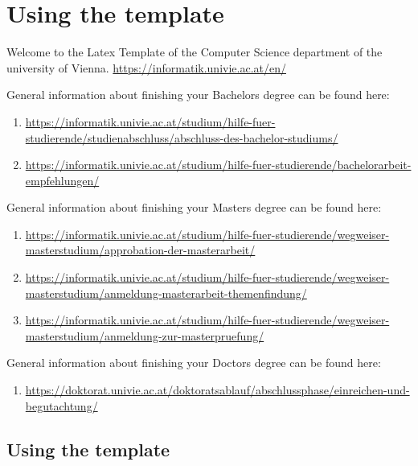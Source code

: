 \chapter{Using the template}
	
Welcome to the Latex Template of the Computer Science department of the university of Vienna. 
\url{https://informatik.univie.ac.at/en/}

General information about finishing your Bachelors degree can be found here:
\begin{enumerate}
    \item \url{https://informatik.univie.ac.at/studium/hilfe-fuer-studierende/studienabschluss/abschluss-des-bachelor-studiums/}
    \item \url{https://informatik.univie.ac.at/studium/hilfe-fuer-studierende/bachelorarbeit-empfehlungen/}
\end{enumerate}

General information about finishing your Masters degree can be found here:
\begin{enumerate}
    \item \url{https://informatik.univie.ac.at/studium/hilfe-fuer-studierende/wegweiser-masterstudium/approbation-der-masterarbeit/}
    \item \url{https://informatik.univie.ac.at/studium/hilfe-fuer-studierende/wegweiser-masterstudium/anmeldung-masterarbeit-themenfindung/}
    \item \url{https://informatik.univie.ac.at/studium/hilfe-fuer-studierende/wegweiser-masterstudium/anmeldung-zur-masterpruefung/}
\end{enumerate}

General information about finishing your Doctors degree can be found here:
\begin{enumerate}
    \item \url{https://doktorat.univie.ac.at/doktoratsablauf/abschlussphase/einreichen-und-begutachtung/}

\end{enumerate}
	
\section{Using the template}

